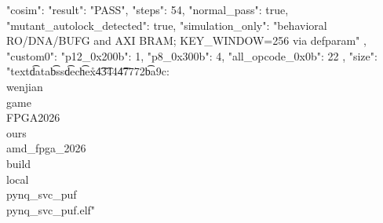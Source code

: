 \begin{codeblock}
{
  "cosim": {
    "result": "PASS",
    "steps": 54,
    "normal_pass": true,
    "mutant_autolock_detected": true,
    "simulation_only": "behavioral RO/DNA/BUFG and AXI BRAM; KEY_WINDOW=256 via defparam"
  },
  "custom0": {
    "p12_0x200b": 1,
    "p8_0x300b": 4,
    "all_opcode_0x0b": 22
  },
  "size": "text\t   data\t    bss\t    dec\t    hex\tfilename\r{}\t      4\t    344\t  47772\t   ba9c\tC:\\wenjian\\game\\FPGA2026\\ours\\amd_fpga_2026\\build\\local\\pynq_svc_puf\\pynq_svc_puf.elf"
}
\end{codeblock}
